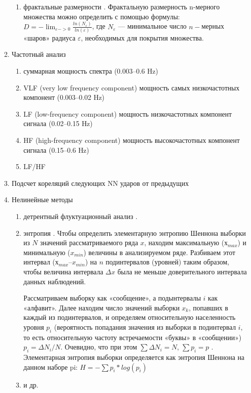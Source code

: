 \begin{enumerate}
\begin{enumerate}
		\item фрактальные размерности \cite{fractal_dim}. Фрактальную размерность n-мерного множества можно определить с помощью формулы: $D=-\lim_{\varepsilon->0}{\frac{ln(N_\varepsilon)}{ln(\varepsilon)}}$,
		где $N_\varepsilon$ — минимальное число $n-$мерных «шаров» радиуса $\varepsilon$, необходимых для покрытия множества.
	\end{enumerate}	
	\item Частотный анализ
	
	\begin{enumerate}
		\item суммарная мощность спектра (0.003–0.6 Hz)
		\item VLF (very low frequency component) мощность самых низкочастотных компонент (0.003–0.02 Hz)
		\item LF (low-frequency component) мощность низкочастотных компонент сигнала (0.02–0.15 Hz)
		\item HF (high-frequency component) мощность высокочастотных компонент сигнала (0.15–0.6 Hz)
		\item LF/HF
	\end{enumerate}
	
	\item Подсчет кореляций следующих NN ударов от предыдущих \cite{autocorr_metric}
	\item Нелинейные методы \cite{non_linear_metric}
	
	\begin{enumerate}
		\item детрентный флуктуационный анализ \cite{fluct_analis}.
		
		\item энтропия \cite{entropy1}. Чтобы определить элементарную энтропию Шеннона выборки из $N$
		значений рассматриваемого ряда ${x}$, находим максимальную ($х_{max}$) и минимальную ($x_{min}$) величины в анализируемом ряде. Разбиваем этот интервал ($х_{max} – x_{min}$) на $n$ подинтервалов (уровней) таким образом, чтобы величина интервала $\Delta x$ была не меньше доверительного интервала данных наблюдений. 
		
		Рассматриваем выборку как «сообщение», а подынтервалы $i$ как «алфавит». Далее находим число значений выборки ${x_k}$, попавших в каждый из подинтервалов, и определяем относительную населенность уровня $p_i$ (вероятность попадания значения из выборки в подинтервал $i$, то есть относительную частоту встречаемости «буквы» в «сообщении») $p_i = \Delta N_i / N$. Очевидно, что при этом $\sum{\Delta N_i} = N$, $\sum{p_i} = p$ . Элементарная энтропия выборки определяется как энтропия Шеннона на данном наборе pi: $H = - \sum{p_i*log(p_i)}$ 
		\item и др. \cite{other_analis1, other_analis2, other_analis3}
	\end{enumerate}	
\end{enumerate}
